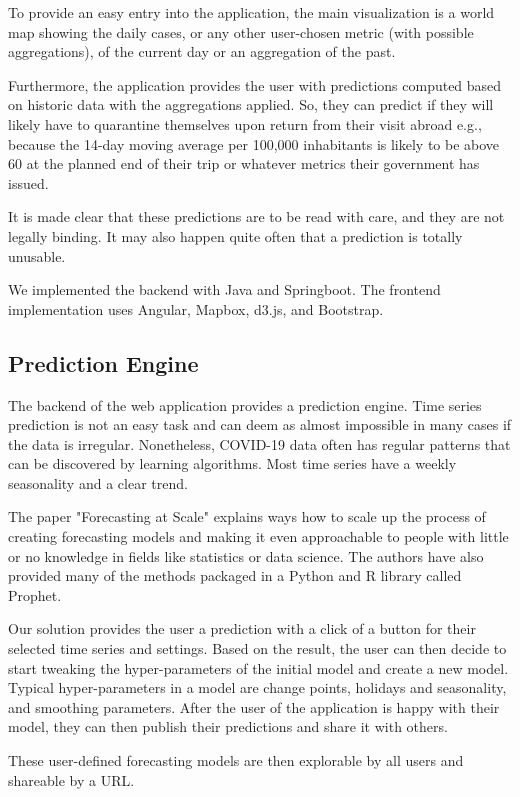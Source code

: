 To provide an easy entry into the application, the main visualization is a world map showing the daily cases, or any other user-chosen metric (with possible aggregations), of the current day or an aggregation of the past.

Furthermore, the application provides the user with predictions computed based on historic data with the aggregations applied. So, they can predict if they will likely have to quarantine themselves upon return from their visit abroad e.g., because the 14-day moving average per 100,000 inhabitants is likely to be above 60 at the planned end of their trip or whatever metrics their government has issued.

It is made clear that these predictions are to be read with care, and they are not legally binding. It may also happen quite often that a prediction is totally unusable.

We implemented the backend with Java and Springboot. The frontend implementation uses Angular, Mapbox, d3.js, and Bootstrap.


\subsection{Prediction Engine}

The backend of the web application provides a prediction engine. Time series prediction is not an easy task and can deem as almost impossible in many cases if the data is irregular. Nonetheless, COVID-19 data often has regular patterns that can be discovered by learning algorithms. Most time series have a weekly seasonality and a clear trend.

The paper "Forecasting at Scale" \cite{b1} explains ways how to scale up the process of creating forecasting models and making it even approachable to people with little or no knowledge in fields like statistics or data science. The authors have also provided many of the methods packaged in a Python and R library called Prophet.

Our solution provides the user a prediction with a click of a button for their selected time series and settings. Based on the result, the user can then decide to start tweaking the hyper-parameters of the initial model and create a new model. Typical hyper-parameters in a model are change points, holidays and seasonality, and smoothing parameters. After the user of the application is happy with their model, they can then publish their predictions and share it with others.

These user-defined forecasting models are then explorable by all users and shareable by a URL.

